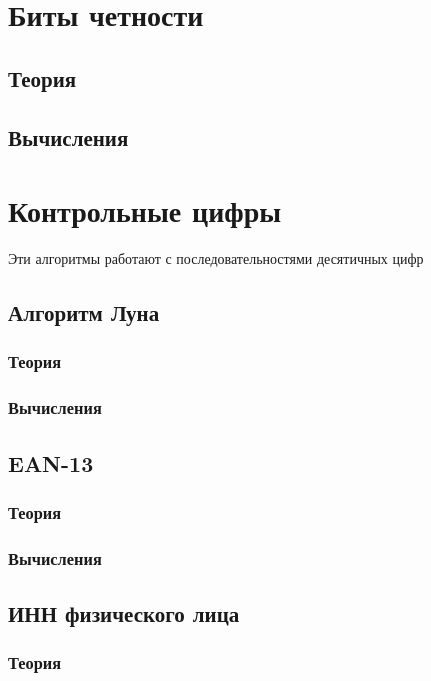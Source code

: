 \documentclass{article}
\begin{document}
\section{Биты четности}
\subsection{Теория}
\subsection{Вычисления}

\section{Контрольные цифры}
Эти алгоритмы работают с последовательностями десятичных цифр
\subsection{Алгоритм Луна}
\subsubsection{Теория}
\subsubsection{Вычисления}

\subsection{EAN-13}
\subsubsection{Теория}
\subsubsection{Вычисления}

\subsection{ИНН физического лица}
\subsubsection{Теория}
\end{document}
